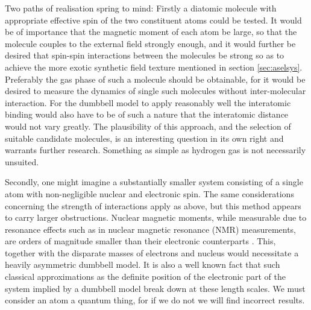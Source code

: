 \documentclass[main.tex]{subfiles}
\begin{document}
Two paths of realisation spring to mind: Firstly a diatomic molecule with appropriate effective
spin of the two constituent atoms could be tested. It would be of importance that the
magnetic moment of each atom be large, so that the molecule couples to the external
field strongly enough, and it would further be desired that spin-spin interactions
between the molecules be strong so as to achieve the more exotic synthetic field texture
mentioned in section \ref{sec:aselsys}. Preferably the gas phase of such a molecule should
be obtainable, for it would be desired to measure the dynamics of single such
molecules without inter-molecular interaction. For the dumbbell model to apply reasonably
well the interatomic binding would also have to be of such a nature that the interatomic
distance would not vary greatly. The plausibility of this approach, and the selection of
suitable candidate molecules, is an interesting question in its own right and warrants
further research. Something as simple as hydrogen gas is not necessarily unsuited.

Secondly, one might imagine a substantially smaller system consisting of a single atom with
non-negligible nuclear and electronic spin. The same considerations concerning the strength
of interactions apply as above, but this method appears to carry
larger obstructions. Nuclear magnetic moments, while measurable due to resonance effects such as in
nuclear magnetic resonance (NMR) measurements, are orders of magnitude smaller than their
electronic counterparts \cite{krane}. This, together with the disparate masses of electrons
and nucleus would necessitate a heavily asymmetric dumbbell model. It is also a well known
fact that such classical approximations as the definite position of the electronic part of
the system implied by a dumbbell model break down at these length scales. We must consider
an atom a quantum thing, for if we do not we will find incorrect results.
\end{document}
